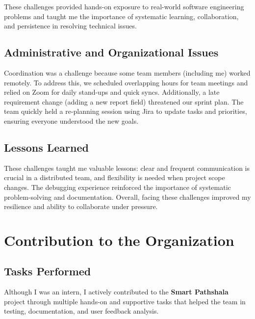 \documentclass[12pt,a4paper]{report}
\newcommand{\project}[1]{\textcolor{projectcolor}{\textbf{#1}}}
\begin{document}
These challenges provided hands-on exposure to real-world software engineering problems and taught me the importance of systematic learning, collaboration, and persistence in resolving technical issues.


\section{Administrative and Organizational Issues}
Coordination was a challenge because some team members (including me) worked remotely. To address this, we scheduled overlapping hours for team meetings and relied on Zoom for daily stand-ups and quick syncs. Additionally, a late requirement change (adding a new report field) threatened our sprint plan. The team quickly held a re-planning session using Jira to update tasks and priorities, ensuring everyone understood the new goals.

\section{Lessons Learned}
These challenges taught me valuable lessons: clear and frequent communication is crucial in a distributed team, and flexibility is needed when project scope changes. The debugging experience reinforced the importance of systematic problem-solving and documentation. Overall, facing these challenges improved my resilience and ability to collaborate under pressure.

\chapter{Contribution to the Organization}

\section{Tasks Performed}
Although I was an intern, I actively contributed to the \project{Smart Pathshala} project through multiple hands-on and supportive tasks that helped the team in testing, documentation, and user feedback analysis.
\end{document}
